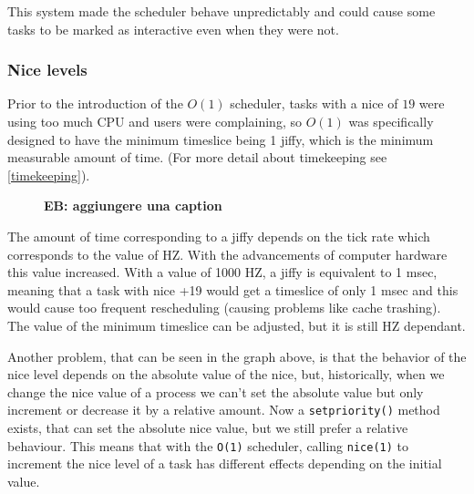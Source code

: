 \documentclass[10pt]{book}
\newcommand{\mycomment}[1]{\textbf{#1}}  %
\begin{document}
This system made the scheduler behave unpredictably and could cause some tasks to be marked as interactive even when they were not.

\subsubsection{Nice levels}%
Prior to the introduction of the $O(1)$ scheduler, tasks with a nice
of $19$ were using too much CPU and users were complaining, so $O(1)$
was specifically designed to have the minimum timeslice being 1 jiffy,
which is the minimum measurable amount of time. (For more detail about
timekeeping see \ref{timekeeping}).

\begin{figure}[t]
  \centering
  \caption{\mycomment{EB: aggiungere una caption}}
\end{figure}

The amount of time corresponding to a jiffy depends on the tick rate which corresponds to the value of HZ. With the advancements of computer hardware this value increased. With a value of 1000 HZ, a jiffy is equivalent to 1 msec, meaning that a task with nice +19 would get a timeslice of only  1 msec and this would cause too frequent rescheduling (causing problems like cache trashing). The value of the minimum timeslice can be adjusted, but it is still HZ dependant.

Another problem, that can be seen in the graph above, is that the behavior of the nice level depends on the absolute value of the nice, but, historically, when we change the nice value of a process we can't set the absolute value but only increment or decrease it by a relative amount. Now a \verb|setpriority()| method exists, that can set the absolute nice value, but we still prefer a relative behaviour. This means that with the \verb|O(1)| scheduler, calling \verb|nice(1)| to increment the nice level of a task has different effects depending on the initial value.
\end{document}
